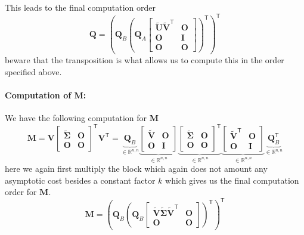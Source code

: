 \documentclass{article}
\newcommand\tr{\mathsf{T}}
\begin{document}
This leads to the final computation order
\begin{equation*}
    \mathbf{Q} = \left(\mathbf{Q}_{B}\left(\mathbf{Q}_{A}\begin{bmatrix}
        \mathbf{\tilde{U}}\mathbf{\tilde{V}}^{\tr}  & \mathbf{O} \\
      \mathbf{O} & \mathbf{I} \\
      \mathbf{O} & \mathbf{O}
      
    \end{bmatrix}\right)^{\tr}\right)^{\tr}
\end{equation*}
beware that the transposition is what allows us to compute this in the order specified above.
\paragraph{Computation of $\mathbf{M}$: } We have the following computation for $\mathbf{M}$
\begin{equation*}
    \mathbf{M} = \mathbf{V}\begin{bmatrix}
        \mathbf{\tilde{\Sigma}} &\mathbf{O} \\
        \mathbf{O} & \mathbf{O}
    \end{bmatrix}^{\tr}\mathbf{V}^{\tr} = 
    \underbrace{\mathbf{Q}_{B}}_{\in \mathbb{R}^{n,n}}
    \underbrace{\begin{bmatrix}
        \mathbf{\tilde{V}} & \mathbf{O} \\
        \mathbf{O} & \mathbf{I}
    \end{bmatrix}}_{\in \mathbb{R}^{n,n}}\underbrace{\begin{bmatrix}
        \mathbf{\tilde{\Sigma}} &\mathbf{O} \\
        \mathbf{O} & \mathbf{O}
    \end{bmatrix}^{\tr}}_{\in \mathbb{R}^{n,n}}\underbrace{\begin{bmatrix}
        \mathbf{\tilde{V}}^{\tr} & \mathbf{O} \\
        \mathbf{O} & \mathbf{I}
    \end{bmatrix}}_{\in \mathbb{R}^{n,n}}\underbrace{\mathbf{Q}_{B}^{\tr}}_{\in \mathbb{R}^{n,n}}
\end{equation*}
here we again first multiply the block which again does not amount any asymptotic cost besides a constant factor $k$ which gives us the final computation order for $\mathbf{M}$.
\begin{equation*}
    \mathbf{M} = \left(\mathbf{Q}_{B}\left(\mathbf{Q}_{B}\begin{bmatrix}
        \mathbf{\tilde{V}}\mathbf{\tilde{\Sigma}}\mathbf{\tilde{V}}^{\tr}   & \mathbf{O} \\
        \mathbf{O} & \mathbf{O}
    \end{bmatrix}\right)^{\tr}\right)^{\tr}
\end{equation*}
\end{document}
